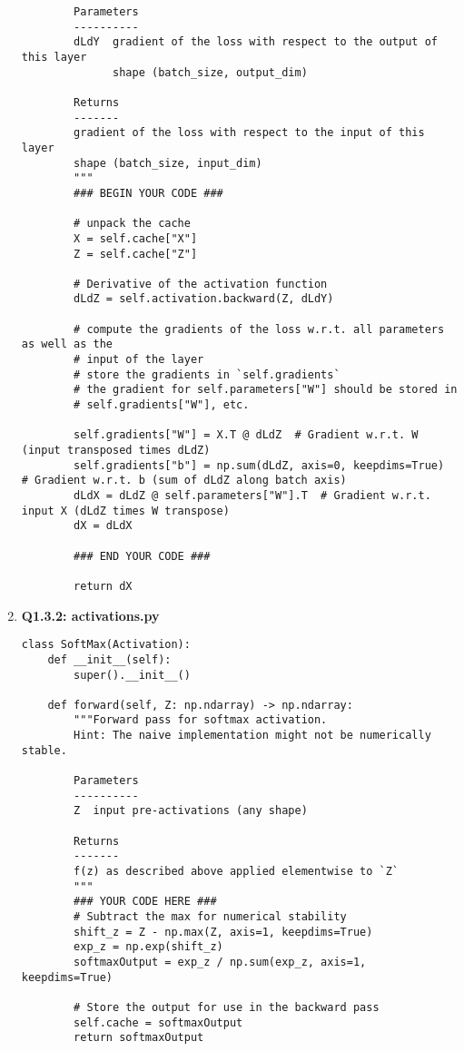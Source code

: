 \documentclass{article}
\begin{document}
\begin{enumerate}
\begin{verbatim}
        Parameters
        ----------
        dLdY  gradient of the loss with respect to the output of this layer
              shape (batch_size, output_dim)

        Returns
        -------
        gradient of the loss with respect to the input of this layer
        shape (batch_size, input_dim)
        """
        ### BEGIN YOUR CODE ###
        
        # unpack the cache
        X = self.cache["X"]
        Z = self.cache["Z"]

        # Derivative of the activation function
        dLdZ = self.activation.backward(Z, dLdY)

        # compute the gradients of the loss w.r.t. all parameters as well as the
        # input of the layer
        # store the gradients in `self.gradients`
        # the gradient for self.parameters["W"] should be stored in
        # self.gradients["W"], etc.

        self.gradients["W"] = X.T @ dLdZ  # Gradient w.r.t. W (input transposed times dLdZ)
        self.gradients["b"] = np.sum(dLdZ, axis=0, keepdims=True)  # Gradient w.r.t. b (sum of dLdZ along batch axis)
        dLdX = dLdZ @ self.parameters["W"].T  # Gradient w.r.t. input X (dLdZ times W transpose)
        dX = dLdX

        ### END YOUR CODE ###

        return dX
\end{verbatim}\newpage

    \item 
     \textbf{Q1.3.2: activations.py}
\begin{verbatim}
class SoftMax(Activation):
    def __init__(self):
        super().__init__()

    def forward(self, Z: np.ndarray) -> np.ndarray:
        """Forward pass for softmax activation.
        Hint: The naive implementation might not be numerically stable.
        
        Parameters
        ----------
        Z  input pre-activations (any shape)

        Returns
        -------
        f(z) as described above applied elementwise to `Z`
        """
        ### YOUR CODE HERE ###
        # Subtract the max for numerical stability
        shift_z = Z - np.max(Z, axis=1, keepdims=True)
        exp_z = np.exp(shift_z)
        softmaxOutput = exp_z / np.sum(exp_z, axis=1, keepdims=True)

        # Store the output for use in the backward pass
        self.cache = softmaxOutput
        return softmaxOutput


\end{verbatim}
\end{enumerate}
\end{document}
